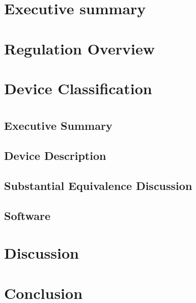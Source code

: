 \documentclass{article}
\begin{document}

\setcounter{tocdepth}{3}
\tableofcontents
\newpage

\section*{Executive summary}
\label{sec:exec-summary}

\section{Regulation Overview}
\label{sec:test-administration}

\section{Device Classification}
\label{sec:protocols}


\section[510(k) Premarket Notification]{}



\setcounter{subsection}{0}






\subsection{Executive Summary}
\subsection{Device Description}
\subsection{Substantial Equivalence Discussion}





\subsection{Software}




\section{Discussion}
\label{sec:discussion}

\section{Conclusion}
\label{sec:conclusion}


\newpage
{}


\end{document}
